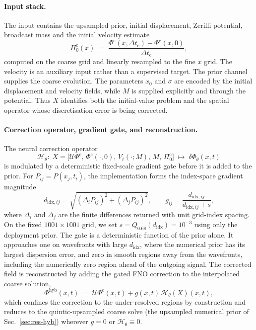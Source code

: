 \paragraph{Input stack.} The input contains the upsampled prior,
initial displacement, Zerilli potential, broadcast mass and the
initial velocity estimate
\begin{equation}
  \Pi^{\mathrm{c}}_{0}(x)
  \;=\; \frac{\Phi^{\mathrm{c}}(x, \Delta t_{\mathrm{c}}) -
              \Phi^{\mathrm{c}}(x, 0)}{\Delta t_{\mathrm{c}}},
  \label{eq:hyb-pi0}
\end{equation}
computed on the coarse grid and linearly resampled to the fine $x$
grid. The velocity is an auxiliary input rather than a supervised
target. The prior channel supplies the coarse evolution.
The parameters $x_0$ and $\sigma$ are encoded by the initial
displacement and velocity fields, while $M$ is supplied explicitly
and through the potential. Thus $X$ identifies both the initial-value
problem and the spatial operator whose discretisation error is being
corrected.

\paragraph{Correction operator, gradient gate, and reconstruction.}
The neural correction operator
\begin{equation}
  \mathcal{H}_{\theta}\colon\;
  X = \bigl[\mathcal{U}\Phi^{\mathrm{c}},\,\Phi^{\mathrm{c}}(\cdot, 0),\,
            V_{\ell}(\cdot; M),\,M,\,\Pi^{\mathrm{c}}_{0}\bigr]
  \;\longmapsto\;
  \delta\Phi_{\theta}(x, t)
  \label{eq:hyb-operator}
\end{equation}
is modulated by a deterministic fixed-scale gradient gate before it is
added to the prior. For $P_{ij}=P(x_j,t_i)$, the implementation forms
the index-space gradient magnitude
\begin{equation}
  d_{\mathrm{idx},ij}
  = \sqrt{(\Delta_i P_{ij})^2+(\Delta_j P_{ij})^2},
  \qquad
  g_{ij}=\frac{d_{\mathrm{idx},ij}}{d_{\mathrm{idx},ij}+s},
  \label{eq:hyb-gate}
\end{equation}
where $\Delta_i$ and $\Delta_j$ are the finite differences returned
with unit grid-index spacing. On the fixed $1001\times1001$ grid, we
set $s=Q_{0.68}(d_{\mathrm{idx}})=10^{-3}$ using only the deployment
prior. The gate is a deterministic function of the prior alone. It
approaches one on wavefronts with large
$d_{\mathrm{idx}}$, where the numerical prior has its largest
dispersion error, and
zero in smooth regions away
from the wavefronts, including the numerically zero region ahead of
the outgoing signal. The corrected field is reconstructed by adding
the gated FNO correction to the interpolated coarse solution,
\begin{equation}
  \Phi^{\mathrm{hyb}}(x, t)
  \;=\; \mathcal{U}\Phi^{\mathrm{c}}(x, t)
         + g(x, t)\,\mathcal{H}_{\theta}(X)(x, t),
  \label{eq:hyb-reconstruct}
\end{equation}
which confines the correction to the under-resolved regions by
construction and reduces to the quintic-upsampled coarse solve
(the upsampled numerical prior of Sec.~\ref{sec:res-hyb}) wherever
$g = 0$ or $\mathcal{H}_{\theta} \equiv 0$.

